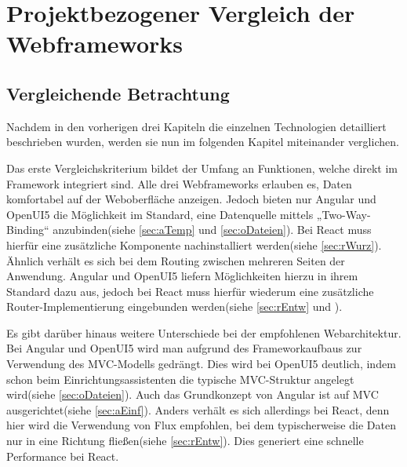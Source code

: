 

\chapter{Projektbezogener Vergleich der Webframeworks}
\section{Vergleichende Betrachtung}\label{sec:vergl}

Nachdem in den vorherigen drei Kapiteln die einzelnen Technologien detailliert beschrieben wurden, werden sie nun im folgenden Kapitel miteinander verglichen.

Das erste Vergleichskriterium bildet der Umfang an Funktionen, welche direkt im Framework integriert sind. Alle drei Webframeworks erlauben es, Daten komfortabel auf der Weboberfläche anzeigen. Jedoch bieten nur Angular und OpenUI5 die Möglichkeit im Standard, eine Datenquelle mittels „Two-Way-Binding“ anzubinden(siehe \autoref{sec:aTemp} und \autoref{sec:oDateien}). Bei React muss hierfür eine zusätzliche Komponente nachinstalliert werden(siehe \autoref{sec:rWurz}). Ähnlich verhält es sich bei dem Routing zwischen mehreren Seiten der Anwendung. Angular und OpenUI5 liefern Möglichkeiten hierzu in ihrem Standard dazu aus, jedoch bei React muss hierfür wiederum eine zusätzliche Router-Implementierung eingebunden werden(siehe \autoref{sec:rEntw} und \autocites[vgl.][8]{Zeigermann.2016}). 

Es gibt darüber hinaus weitere Unterschiede bei der empfohlenen Webarchitektur. Bei Angular und OpenUI5 wird man aufgrund des Frameworkaufbaus zur Verwendung des MVC-Modells gedrängt. Dies wird bei OpenUI5 deutlich, indem schon beim Einrichtungsassistenten die typische MVC-Struktur angelegt wird(siehe \autoref{sec:oDateien}). Auch das Grundkonzept von Angular ist auf MVC ausgerichtet(siehe \autoref{sec:aEinf}). Anders verhält es sich allerdings bei React, denn hier wird die Verwendung von Flux empfohlen, bei dem typischerweise die Daten nur in eine Richtung fließen(siehe \autoref{sec:rEntw}). Dies generiert eine schnelle Performance bei React.


